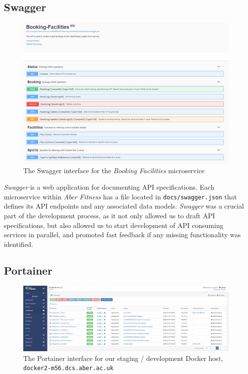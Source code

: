 \subsection{Swagger}
\begin{figure}[H]
    \centering
    \includegraphics[width=\textwidth]{Images/Swagger.png}
    \caption{The Swagger interface for the \textit{Booking Facilities} microservice}
    \label{fig:swagger_ui}
\end{figure}

\textit{Swagger} is a web application for documenting API specifications. Each microservice within \textit{Aber Fitness} has a file located in \lstinline{docs/swagger.json} that defines its API endpoints and any associated data models. \textit{Swagger} was a crucial part of the development process, as it not only allowed us to draft API specifications, but also allowed us to start development of API consuming services in parallel, and promoted fast feedback if any missing functionality was identified.

\subsection{Portainer}
\begin{figure}[H]
    \centering
    \includegraphics[width=\textwidth]{Images/Portainer.png}
    \caption{The Portainer interface for our staging / development Docker host, \lstinline{docker2-m56.dcs.aber.ac.uk}}
    \label{fig:portainer_ui}
\end{figure}

